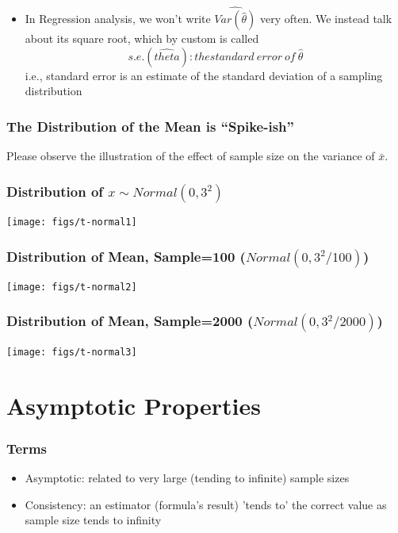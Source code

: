 \documentclass[10pt,english]{beamer}
\begin{document}
\begin{frame}[allowframebreaks]
\begin{itemize}
  \item In Regression analysis, we won't write $\widehat{Var(\hat{\theta})}$
    very often. We instead talk about its square root, which by
    custom is called
    \begin{displaymath}
      s.e.(\hat{theta}): the standard\ error\ of\ \hat{\theta}
    \end{displaymath}
    i.e., standard error is an estimate of the standard deviation of a
    sampling distribution
  \end{itemize}
\end{frame}


\begin{frame}
  \frametitle{The Distribution of the Mean is ``Spike-ish''}

Please observe the illustration of the effect of sample size on the
variance of $\bar{x}$.

\end{frame}




\begin{frame}

\frametitle{Distribution of $x \sim Normal(0, 3^{2})$}

\texttt{[image: figs/t-normal1]}
\end{frame}



\begin{frame}[containsverbatim]
 \frametitle{Distribution of Mean, Sample=100 ($Normal(0,3^{2}/100)$)}
\texttt{[image: figs/t-normal2]}
\end{frame}



\begin{frame}
 \frametitle{Distribution of Mean, Sample=2000 ($Normal(0,3^{2}/2000)$)}
\texttt{[image: figs/t-normal3]}
\end{frame}


\section{Asymptotic Properties}

\begin{frame}
  \frametitle{Terms}
  \begin{itemize}
  \item Asymptotic: related to very large (tending to infinite)
    sample sizes
  \item Consistency: an estimator (formula's result) 'tends to' the
    correct value as sample size tends to infinity
  \end{itemize}
\end{frame}
\end{document}
